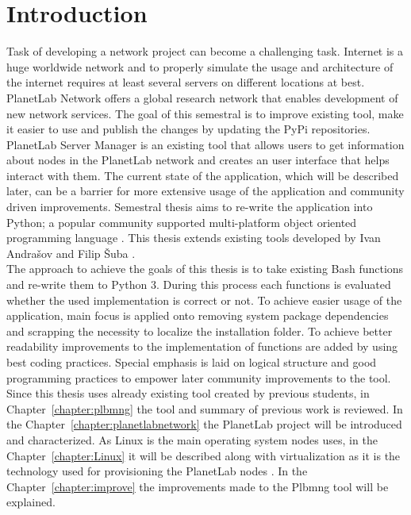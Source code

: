 \chapter*{Introduction}
{}

Task of developing a network project can become a challenging task. Internet is a huge worldwide network and to properly simulate the usage and architecture of the internet requires at least several servers on different locations at best. PlanetLab Network offers a global research network that enables development of new network services. The goal of this semestral is to improve existing tool, make it easier to use and publish the changes by updating the PyPi repositories. PlanetLab Server Manager is an existing tool that allows users to get information about nodes in the PlanetLab network and creates an user interface that helps interact with them. The current state of the application, which will be described later, can be a barrier for more extensive usage of the application and community driven improvements. Semestral thesis aims to re-write the application into Python; a popular community supported multi-platform object oriented programming language \cite{lutz2013learning}. This thesis extends existing tools developed by Ivan Andrašov \cite{andrasov2} and Filip Šuba \cite{suba1}.\\
The approach to achieve the goals of this thesis is to take existing Bash functions and re-write them to Python 3. During this process each functions is evaluated whether the used implementation is correct or not. To achieve easier usage of the application, main focus is applied onto removing system package dependencies and scrapping the necessity to localize the installation folder. To achieve better readability improvements to the implementation of functions are added by using best coding practices. Special emphasis is laid on logical structure and good programming practices to empower later community improvements to the tool.\\
Since this thesis uses already existing tool created by previous students, in Chapter~\ref{chapter:plbmng} the tool and summary of previous work is reviewed. In the Chapter~\ref{chapter:planetlabnetwork} the PlanetLab project will be introduced and characterized. As Linux is the main operating system nodes uses, in the Chapter~\ref{chapter:Linux} it will be described along with virtualization as it is the technology used for provisioning the PlanetLab nodes \cite{planetlababout}. In the Chapter~\ref{chapter:improve} the improvements made to the Plbmng tool will be explained.